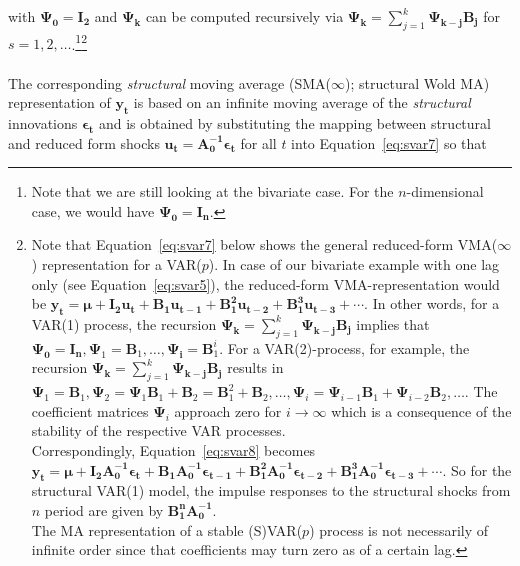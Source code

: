 \documentclass[a4paper,11pt,listof=nochaptergap,oneside,pointednumbers,bibtotoc,bigheadings,liststotoc]{scrbook}
\theoremstyle{mysatz}
\theoremstyle{mydefinition}
\theoremstyle{mybemerkung}
\newcommand{\vect}[1]{\boldsymbol{\mathbf{#1}}}
\begin{document}
with $\vect{\Psi_0} =\vect{\mathbf{I_2}}$ and $\vect{\Psi_k}$ can be computed recursively via $\vect{\Psi_k} = \sum\limits_{j=1}^k \vect{\Psi_{k-j}\vect{B_j}}$ for $s=1, 2, \dots$.\footnote{Note that we are still looking at the bivariate case. For the $n$-dimensional case, we would have $\vect{\Psi_0} =\vect{\mathbf{I_n}}$.}\footnote{Note that Equation~\ref{eq:svar7} below shows the general reduced-form VMA($\infty$) representation for a VAR($p$). In case of our bivariate example with one lag only (see Equation~\ref{eq:svar5}), the reduced-form VMA-representation would be $\vect{y_t} = \vect{\mu} + \vect{I_2}\vect{u_t} + \vect{{B}_1}\vect{u_{t-1}} + \vect{{B}_1^2}\vect{u_{t-2}} + \vect{{B}_1^3}\vect{u_{t-3}} + \cdots$. In other words, for a VAR(1) process, the recursion $\vect{\Psi_k} = \sum\limits_{j=1}^k \vect{\Psi_{k-j}\vect{B_j}}$ implies that $\vect{\Psi_0}=\vect{I_n}, \vect{\Psi}_1 = \vect{B}_1, \dots, \vect{\Psi_i} = {\vect{B}}_1^i$. For a VAR(2)-process, for example, the recursion $\vect{\Psi_k} = \sum\limits_{j=1}^k \vect{\Psi_{k-j}\vect{B_j}}$ results in $\vect{\Psi}_1 = \vect{B}_1, \vect{\Psi}_2 = \vect{\Psi}_1\vect{B}_1 + \vect{B}_2 = \vect{B}_1^2 + \vect{B}_2, \dots, \vect{\Psi}_i = \vect{\Psi}_{i-1}\vect{B}_1 + \vect{\Psi}_{i-2}\vect{B}_2, \dots$. The coefficient matrices $\vect{\Psi}_i$ approach zero for $i \to \infty$ which is a consequence of the stability of the respective VAR processes.\\
Correspondingly, Equation~\ref{eq:svar8} becomes $\vect{y_t} = \vect{\mu} + \vect{I_2}\vect{{A}_0^{-1}}\vect{\epsilon_t} + \vect{{B}_1}\vect{{A}_0^{-1}}\vect{\epsilon_{t-1}} + \vect{{B}_1^2}\vect{{A}_0^{-1}}\vect{\epsilon_{t-2}} + \vect{{B}_1^3}\vect{{A}_0^{-1}}\vect{\epsilon_{t-3}} + \cdots$. So for the structural VAR(1) model, the impulse responses to the structural shocks from $n$ period are given by $\vect{{B}_1^n}\vect{{A}_0^{-1}}$.\\
The MA representation of a stable (S)VAR($p$) process is not necessarily of infinite order since that coefficients may turn zero as of a certain lag.} \\
\\
The corresponding \textit{structural} moving average (SMA($\infty$); structural Wold MA) representation of $\vect{y_t}$ is based on an infinite moving average of the \textit{structural} innovations $\vect{\epsilon_t}$ and is obtained by substituting the mapping between structural and reduced form shocks $\vect{u_t} = \vect{A_0^{-1}}\vect{\epsilon_t}$ for all $t$ into Equation~\ref{eq:svar7} so that
\end{document}
